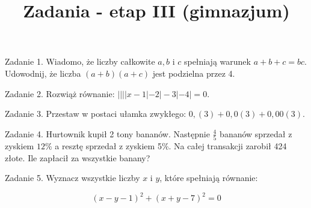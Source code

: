 \documentclass[10pt]{article}
\title{Zadania - etap III (gimnazjum) }
\author{}
\date{}
\begin{document}
\maketitle
Zadanie 1. Wiadomo, że liczby całkowite \(a, b\) i \(c\) spełniają warunek \(a+b+c=b c\). Udowodnij, że liczba \((a+b)(a+c)\) jest podzielna przez 4.

Zadanie 2. Rozwiąż równanie: \(||||x-1|-2|-3|-4|=0\).

Zadanie 3. Przestaw w postaci ułamka zwykłego: \(0,(3)+0,0(3)+0,00(3)\).

Zadanie 4. Hurtownik kupił 2 tony bananów. Następnie \(\frac{4}{5}\) bananów sprzedał z zyskiem \(12 \%\) a resztę sprzedał z zyskiem 5\%. Na całej transakcji zarobił 424 złote. Ile zapłacił za wszystkie banany?

Zadanie 5. Wyznacz wszystkie liczby \(x\) i \(y\), które spełniają równanie:

\[
(x-y-1)^{2}+(x+y-7)^{2}=0
\]
\end{document}
